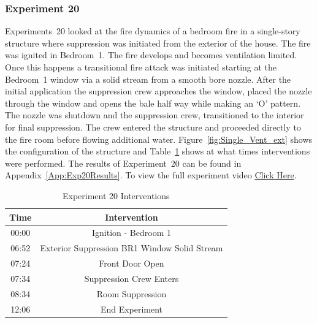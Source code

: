 \documentclass[12pt,oneside]{book}
\begin{document}
\subsubsection{Experiment 20}
Experiments~20 looked at the fire dynamics of a bedroom fire in a single-story structure where suppression was initiated from the exterior of the house. The fire was ignited in Bedroom~1. The fire develops and becomes ventilation limited. Once this happens a transitional fire attack was initiated starting at the Bedroom~1 window via a solid stream from a smooth bore nozzle. After the initial application the suppression crew approaches the window, placed the nozzle through the window and opens the bale half way while making an `O' pattern. The nozzle was shutdown and the suppression crew, transitioned to the interior for final suppression. The crew entered the structure and proceeded directly to the fire room before flowing additional water. Figure~\ref{fig:Single_Vent_ext} shows the configuration of the structure and Table~\ref{Table:Exp20Interventions} shows at what times interventions were performed. The results of Experiment~20 can be found in Appendix~\ref{App:Exp20Results}. To view the full experiment video \href{https://player.vimeo.com/video/170499620?autoplay=1}{Click Here}.

\begin{table}[H]
	\centering
	\caption{Experiment 20 Interventions}
	\begin{tabular}{|c|c|} 
		\hline
		Time & Intervention \\ \hline \hline
		00:00 & Ignition - Bedroom 1 \\ \hline
		06:52 & Exterior Suppression BR1 Window Solid Stream \\ \hline
		07:24 & Front Door Open \\ \hline
		07:34 & Suppression Crew Enters\\ \hline
		08:34 & Room Suppression \\ \hline 
		12:06 & End Experiment\\ \hline
	\end{tabular}
	\label{Table:Exp20Interventions}
\end{table}

\FloatBarrier
\end{document}
